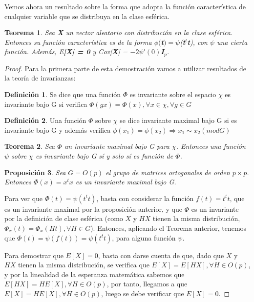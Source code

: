 \documentclass{article}
\theoremstyle{theorem-style}  %
\newtheorem{theorem}{Teorema}[section]  %
\newtheorem{proposition}[theorem]{Proposición}
\theoremstyle{definition}
\newtheorem{definition}{Definición}[section]
\theoremstyle{example-style}
\begin{document}
	Vemos ahora un resultado sobre la forma que adopta la función característica de cualquier variable que se distribuya en la clase esférica.
	
	\begin{theorem}
		Sea \textbf{X} un vector aleatorio con distribución en la clase esférica. Entonces su función característica es de la forma $\phi($\textbf{t}$) = \psi$(\textbf{t}$^t$\textbf{t}), con $\psi$ una cierta función. Además, E\textbf{[X] = 0} y Cov[\textbf{X}]  = $-2\psi'(0)$\textbf{I}$_p$.
	\end{theorem}

	\begin{proof}
		
		Para la primera parte de esta demostración vamos a utilizar resultados de la teoría de invarianzas:
		
		\begin{definition}
			Se dice que una función $\Phi$ es invariante sobre el espacio $\chi$ es invariante bajo G si verifica $\Phi(gx) = \Phi(x), \forall x \in \chi, \forall g \in G$
		\end{definition}
	
		\begin{definition}
			Una función $\Phi$ sobre $\chi$ se dice invariante maximal bajo G si es invariante bajo G y además verifica $\phi(x_1) = \phi(x_2) \Rightarrow x_1 \sim x_2 (mod G)$
		\end{definition}
	
		\begin{theorem}
			Sea $\Phi$ un invariante maximal bajo G para $\chi$. Entonces una función $\psi$ sobre $\chi$ es invariante bajo G sí y solo sí es función de $\Phi$.
		\end{theorem}
	
	\begin{proposition}
		Sea $G = O(p)$ el grupo  de matrices ortogonales de orden $p \times p$. Entonces $\Phi(x) = x^tx$ es un invariante maximal bajo G.
	\end{proposition}

	Para ver que $\Phi(t) = \psi(t^tt)$, basta con considerar la función $f(t) = t^tt$, que es un invariante maximal por la proposición anterior, y que $\Phi$ es un invariante por la definición de clase esférica (como $X$ y $HX$ tienen la misma distribución, $\Phi_x(t) = \Phi_x(Ht), \forall H \in G$). Entonces, aplicando el Teorema anterior, tenemos que $\Phi(t) = \psi(f(t)) = \psi(t^tt)$, para alguna función $\psi$.
	
	Para demostrar que $E[X] = 0$, basta con darse cuenta de que, dado que $X$ y $HX$  tienen la misma distribución, se verifica que $E[X] = E[HX], \forall H \in O(p)$,  y por la linealidad de la esperanza matemática sabemos que $E[HX] = H E[X], \forall H \in O(p)$, por tanto, llegamos a que $E[X] = HE[X], \forall H \in O(p)$, luego se debe verificar que $E[X] = 0$.
	

\end{proof}
\end{document}
